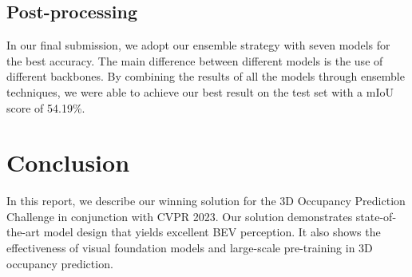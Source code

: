 \documentclass[10pt,twocolumn,letterpaper]{article}
\begin{document}
\subsection{Post-processing}
In our final submission, we adopt our ensemble strategy with seven models for the best accuracy.
The main difference between different models is the use of different backbones. By combining the results of all the models through ensemble techniques, we were able to achieve our best result on the test set with a mIoU score of 54.19\%.

\section{Conclusion}
In this report, we describe our winning solution for the 3D Occupancy Prediction Challenge in conjunction with CVPR 2023. Our solution demonstrates state-of-the-art model design that yields excellent BEV perception. It also shows the effectiveness of visual foundation models and large-scale pre-training in 3D occupancy prediction.

\clearpage


\end{document}
